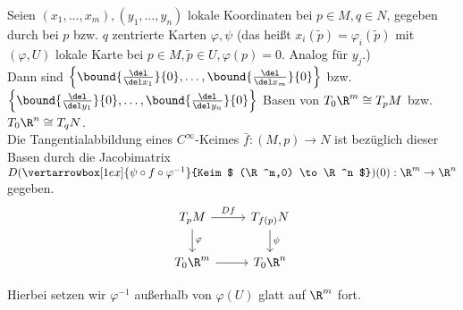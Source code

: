 \begin{thm}
	Seien $ (x_1,\dotsc,x_m),(y_1,\dotsc,y_n) $ lokale Koordinaten bei $p \in M, q \in N$, gegeben durch bei $p$ bzw. $q$ zentrierte Karten $ \varphi,\psi $ (das heißt $ x_i(\tilde{p}) = \varphi_i (\tilde{p}) $ mit $(\varphi,U)$ lokale Karte bei $p \in M, \tilde{p} \in U, \varphi(p) = 0$. Analog für $y_j$.)\\
	Dann sind $ \left\{ \bound{\frac{\del}{\del x_1}}{0}, \dotsc, \bound{\frac{\del}{\del x_m}}{0} \right\} $ bzw. $ \left\{ \bound{\frac{\del}{\del y_1}}{0}, \dotsc, \bound{\frac{\del}{\del y_n}}{0} \right\} $ Basen von $ T_0\R^m \cong T_pM $ bzw. $ T_0\R^n \cong T_qN $.\\
	Die Tangentialabbildung eines $C^\infty$-Keimes $\bar{f}: (M,p) \to N$ ist bezüglich dieser Basen durch die Jacobimatrix $ D( \vertarrowbox[1ex]{\psi \circ f \circ \varphi^{-1}}{Keim $ (\R^m,0) \to \R^n $} ) (0): \R^m \to \R^n $ gegeben.
	\[ \begin{tikzcd}
		T_pM \arrow{r}{Df} \arrow{d}{\varphi} & T_{f(p)}N \arrow{d}{\psi}\\
		T_0\R^m \arrow[r] & T_0\R^n
	\end{tikzcd} \]
\end{thm}

\begin{rem*}	
	Hierbei setzen wir $ \varphi^{-1} $ außerhalb von $ \varphi(U) $ glatt auf $\R^m$ fort.
\end{rem*}

